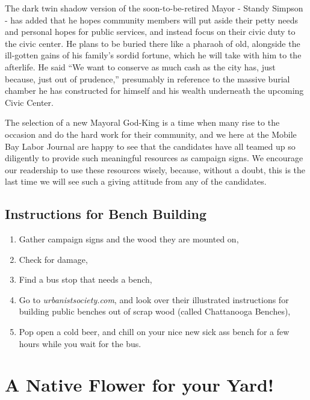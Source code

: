 \documentclass[
]{book}
\begin{document}
The dark twin shadow version of the soon-to-be-retired Mayor - Standy Simpson - has added that he hopes community members will put aside their petty needs and personal hopes for public services, and instead focus on their civic duty to the civic center. He plans to be buried there like a pharaoh of old, alongside the ill-gotten gains of his family's sordid fortune, which he will take with him to the afterlife. He said ``We want to conserve as much cash as the city has, just because, just out of prudence,'' presumably in reference to the massive burial chamber he has constructed for himself and his wealth underneath the upcoming Civic Center.

The selection of a new Mayoral God-King is a time when many rise to the occasion and do the hard work for their community, and we here at the Mobile Bay Labor Journal are happy to see that the candidates have all teamed up so diligently to provide such meaningful resources as campaign signs. We encourage our readership to use these resources wisely, because, without a doubt, this is the last time we will see such a giving attitude from any of the candidates.

\subsection*{Instructions for Bench Building}\label{instructions-for-bench-building}

\begin{enumerate}
\def\labelenumi{\arabic{enumi}.}
\item
  Gather campaign signs and the wood they are mounted on,
\item
  Check for damage,
\item
  Find a bus stop that needs a bench,
\item
  Go to \emph{urbanistsociety.com}, and look over their illustrated instructions for building public benches out of scrap wood (called Chattanooga Benches),
\item
  Pop open a cold beer, and chill on your nice new sick ass bench for a few hours while you wait for the bus.
\end{enumerate}

\section*{A Native Flower for your Yard!}\label{a-native-flower-for-your-yard}
\end{document}
